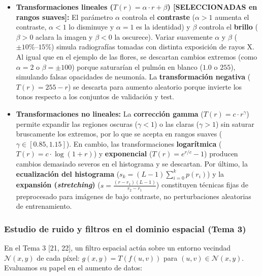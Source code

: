 \documentclass[11pt, a4paper]{article}
\numberwithin{equation}{section}
\begin{document}
\begin{itemize}
    \item \textbf{Transformaciones lineales ($T(r) = \alpha \cdot r + \beta$) [SELECCIONADAS en rangos suaves]:}
    El parámetro $\alpha$ controla el \textbf{contraste} ($\alpha > 1$ aumenta el contraste, $\alpha < 1$ lo disminuye y $\alpha = 1$ es la identidad) y $\beta$ controla el \textbf{brillo} ($\beta > 0$ aclara la imagen y $\beta < 0$ la oscurece). Variar suavemente $\alpha$ y $\beta$ ($\pm 10\%\text{--}15\%$) simula radiografías tomadas con distinta exposición de rayos X. Al igual que en el ejemplo de las flores, se descartan cambios extremos (como $\alpha=2$ o $\beta=\pm 100$) porque saturarían el pulmón en blanco ($1.0$ o $255$), simulando falsas opacidades de neumonía. La \textbf{transformación negativa} ($T(r) = 255 - r$) se descarta para aumento aleatorio porque invierte los tonos respecto a los conjuntos de validación y test.
    \item \textbf{Transformaciones no lineales:}
    La \textbf{corrección gamma} ($T(r) = c \cdot r^\gamma$) permite expandir las regiones oscuras ($\gamma < 1$) o las claras ($\gamma > 1$) sin saturar bruscamente los extremos, por lo que se acepta en rangos suaves ($\gamma \in [0.85, 1.15]$). En cambio, las transformaciones \textbf{logarítmica} ($T(r) = c \cdot \log(1+r)$) y \textbf{exponencial} ($T(r) = e^{r/c}-1$) producen cambios demasiado severos en el histograma y se descartan. Por último, la \textbf{ecualización del histograma} ($s_k = (L-1)\sum_{i=0}^{k} p(r_i)$) y la \textbf{expansión (\textit{stretching})} ($s = \frac{(r-r_1)(L-1)}{r_2-r_1}$) constituyen técnicas fijas de preprocesado para imágenes de bajo contraste, no perturbaciones aleatorias de entrenamiento.
\end{itemize}

\subsubsection{Estudio de ruido y filtros en el dominio espacial (Tema 3)}
En el Tema 3 [21, 22], un filtro espacial actúa sobre un entorno vecindad $\mathcal{N}(x,y)$ de cada píxel: $g(x,y) = T(f(u,v))$ para $(u,v) \in \mathcal{N}(x,y)$. Evaluamos su papel en el aumento de datos:
\end{document}
